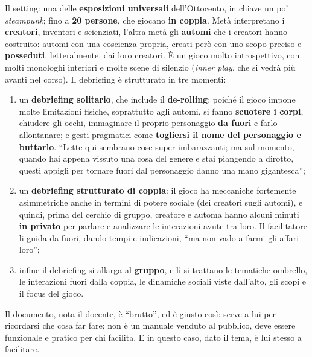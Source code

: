 Il setting: una delle \textbf{esposizioni universali} dell'Ottocento, in chiave un po'
\emph{steampunk}; fino a \textbf{20 persone}, che giocano \textbf{in coppia}. Metà
interpretano i \textbf{creatori}, inventori e scienziati, l'altra metà gli
\textbf{automi} che i creatori hanno costruito: automi con una coscienza propria,
creati però con uno scopo preciso e \textbf{posseduti}, letteralmente, dai loro
creatori. È un gioco molto introspettivo, con molti monologhi interiori e molte scene di
silenzio (\emph{inner play}, che si vedrà più avanti nel corso). Il debriefing è
strutturato in tre momenti:
\begin{enumerate}
  \item un \textbf{debriefing solitario}, che include il \textbf{de-rolling}: poiché il
        gioco impone molte limitazioni fisiche, soprattutto agli automi, si fanno
        \textbf{scuotere i corpi}, chiudere gli occhi, immaginare il proprio personaggio
        \textbf{da fuori} e farlo allontanare; e gesti pragmatici come \textbf{togliersi
        il nome del personaggio e buttarlo}. ``Lette qui sembrano cose super
        imbarazzanti; ma sul momento, quando hai appena vissuto una cosa del genere e
        stai piangendo a dirotto, questi appigli per tornare fuori dal personaggio
        danno una mano gigantesca'';
  \item un \textbf{debriefing strutturato di coppia}: il gioco ha meccaniche
        fortemente asimmetriche anche in termini di potere sociale (dei creatori sugli
        automi), e quindi, prima del cerchio di gruppo, creatore e automa hanno alcuni
        minuti \textbf{in privato} per parlare e analizzare le interazioni avute tra
        loro. Il facilitatore li guida da fuori, dando tempi e indicazioni, ``ma non
        vado a farmi gli affari loro'';
  \item infine il debriefing si allarga al \textbf{gruppo}, e lì si trattano le
        tematiche ombrello, le interazioni fuori dalla coppia, le dinamiche sociali
        viste dall'alto, gli scopi e il focus del gioco.
\end{enumerate}
Il documento, nota il docente, è ``brutto'', ed è giusto così: serve a lui per
ricordarsi che cosa far fare; non è un manuale venduto al pubblico, deve essere
funzionale e pratico per chi facilita. E in questo caso, dato il tema, è lui stesso a
facilitare.

